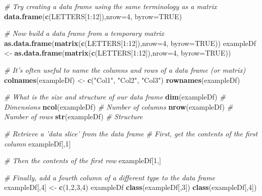 \documentclass[a4paper]{book}
\newenvironment{Shaded}{\begin{snugshade}}{\end{snugshade}}
\newcommand{\KeywordTok}[1]{\textcolor[rgb]{0.13,0.29,0.53}{\textbf{{#1}}}}
\newcommand{\DataTypeTok}[1]{\textcolor[rgb]{0.13,0.29,0.53}{{#1}}}
\newcommand{\DecValTok}[1]{\textcolor[rgb]{0.00,0.00,0.81}{{#1}}}
\newcommand{\StringTok}[1]{\textcolor[rgb]{0.31,0.60,0.02}{{#1}}}
\newcommand{\CommentTok}[1]{\textcolor[rgb]{0.56,0.35,0.01}{\textit{{#1}}}}
\newcommand{\OtherTok}[1]{\textcolor[rgb]{0.56,0.35,0.01}{{#1}}}
\newcommand{\NormalTok}[1]{{#1}}
\renewenvironment{Shaded}
{\vspace{1.5em}\begin{leftbar}\begin{snugshade}}
{\end{snugshade}\end{leftbar}\vspace{3pt}}
\begin{document}
\begin{Shaded}
\begin{Highlighting}[]
\CommentTok{# Try creating a data frame using the same terminology as a matrix}
\KeywordTok{data.frame}\NormalTok{(}\KeywordTok{c}\NormalTok{(LETTERS[}\DecValTok{1}\NormalTok{:}\DecValTok{12}\NormalTok{]),}\DataTypeTok{nrow=}\DecValTok{4}\NormalTok{, }\DataTypeTok{byrow=}\OtherTok{TRUE}\NormalTok{)}

\CommentTok{# Now build a data frame from a temporary matrix}
\KeywordTok{as.data.frame}\NormalTok{(}\KeywordTok{matrix}\NormalTok{(}\KeywordTok{c}\NormalTok{(LETTERS[}\DecValTok{1}\NormalTok{:}\DecValTok{12}\NormalTok{]),}\DataTypeTok{nrow=}\DecValTok{4}\NormalTok{, }\DataTypeTok{byrow=}\OtherTok{TRUE}\NormalTok{))}
\NormalTok{exampleDf <-}\StringTok{ }\KeywordTok{as.data.frame}\NormalTok{(}\KeywordTok{matrix}\NormalTok{(}\KeywordTok{c}\NormalTok{(LETTERS[}\DecValTok{1}\NormalTok{:}\DecValTok{12}\NormalTok{]),}\DataTypeTok{nrow=}\DecValTok{4}\NormalTok{, }\DataTypeTok{byrow=}\OtherTok{TRUE}\NormalTok{))}

\CommentTok{# It's often useful to name the columns and rows of a data frame (or matrix)}
\KeywordTok{colnames}\NormalTok{(exampleDf) <-}\StringTok{ }\KeywordTok{c}\NormalTok{(}\StringTok{"Col1"}\NormalTok{, }\StringTok{"Col2"}\NormalTok{, }\StringTok{"Col3"}\NormalTok{)}
\KeywordTok{rownames}\NormalTok{(exampleDf)}

\CommentTok{# What is the size and structure of our data frame}
\KeywordTok{dim}\NormalTok{(exampleDf) }\CommentTok{# Dimensions}
\KeywordTok{ncol}\NormalTok{(exampleDf) }\CommentTok{# Number of columns}
\KeywordTok{nrow}\NormalTok{(exampleDf) }\CommentTok{# Number of rows}
\KeywordTok{str}\NormalTok{(exampleDf) }\CommentTok{# Structure}

\CommentTok{# Retrieve a 'data slice' from the data frame}
\CommentTok{# First, get the contents of the first column}
\NormalTok{exampleDf[,}\DecValTok{1}\NormalTok{]}

\CommentTok{# Then the contents of the first row}
\NormalTok{exampleDf[}\DecValTok{1}\NormalTok{,]}

\CommentTok{# Finally, add a fourth column of a different type to the data frame}
\NormalTok{exampleDf[,}\DecValTok{4}\NormalTok{] <-}\StringTok{ }\KeywordTok{c}\NormalTok{(}\DecValTok{1}\NormalTok{,}\DecValTok{2}\NormalTok{,}\DecValTok{3}\NormalTok{,}\DecValTok{4}\NormalTok{)}
\NormalTok{exampleDf}
\KeywordTok{class}\NormalTok{(exampleDf[,}\DecValTok{3}\NormalTok{])}
\KeywordTok{class}\NormalTok{(exampleDf[,}\DecValTok{4}\NormalTok{])}
\end{Highlighting}
\end{Shaded}
\end{document}
